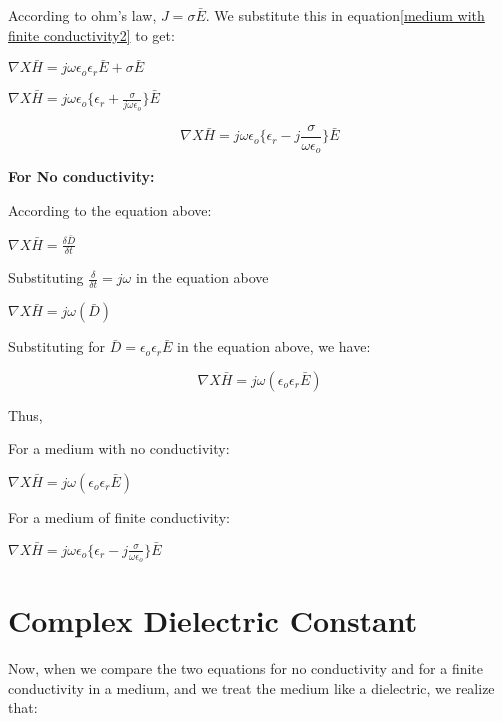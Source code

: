 According to ohm's law, $J = \sigma\bar{E}$. We substitute this in equation\ref{medium with finite conductivity2} to get:

\begin{center}
$\nabla X \bar{H} = j\omega\epsilon_{o}\epsilon_{r}\bar{E} + \sigma\bar{E}$ 
\end{center}

\begin{center}
$\nabla X \bar{H} = j\omega\epsilon_{o}\{\epsilon_{r} + \frac{\sigma}{j\omega\epsilon_{o}}\}\bar{E}$ 
\end{center}

\begin{equation}
\nabla X \bar{H} = j\omega\epsilon_{o}\Bigg\{\epsilon_{r} -j \frac{\sigma}{\omega\epsilon_{o}}\Bigg\}\bar{E} 
\end{equation}

\textbf{For No conductivity:}

According to the equation above:

\begin{center}
$\nabla X \bar{H} = \frac{\delta \bar {D}}{\delta t}$
\end{center}

Substituting $\frac{\delta}{\delta t} = j\omega$ in the equation above

\begin{center}
$\nabla X \bar{H} = j \omega(\bar{D})$
\end{center}

Substituting for $\bar{D} = \epsilon_{o}\epsilon_{r}\bar{E}$ in the equation above, we have:

\begin{equation}
\nabla X \bar{H} = j \omega(\epsilon_{o}\epsilon_{r}\bar{E})
\end{equation}



Thus,

For a medium with no conductivity:
\begin{center}
$\nabla X \bar{H} = j \omega(\epsilon_{o}\epsilon_{r}\bar{E})$
\end{center}

For a medium of finite conductivity:
\begin{center}
$\nabla X \bar{H} = j\omega\epsilon_{o}\bigg\{\epsilon_{r} -j \frac{\sigma}{\omega\epsilon_{o}}\bigg\}\bar{E}$ 
\end{center}

\section{Complex Dielectric Constant}
Now, when we compare the two equations for no conductivity and for a finite conductivity in a medium, and we treat the medium like a dielectric, we realize that:

